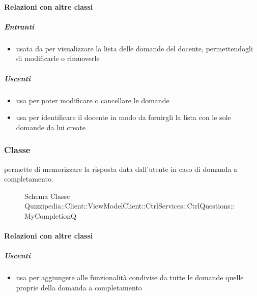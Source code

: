\paragraph{Relazioni con altre classi}
\subparagraph{Entranti}
\begin{itemize}
\item usata da  per visualizzare la lista delle domande del docente, permettendogli di modificarle o rimuoverle
\end{itemize}
\subparagraph{Uscenti}
\begin{itemize}
\item usa  per poter modificare o cancellare le domande
\item usa  per identificare il docente in modo da fornirgli la lista con le sole domande da lui create
\end{itemize}
\subsubsection{Classe }
permette di memorizzare la risposta data dall'utente in caso di domanda a completamento.
\begin{figure}[H]
\centering
\noindent{}
\caption[Schema Classe MyCompletionQ]{Schema Classe Quizzipedia::Client::ViewModelClient::CtrlServices::CtrlQuestions::MyCompletionQ}
\end{figure}
\paragraph{Relazioni con altre classi}
\subparagraph{Uscenti}
\begin{itemize}
\item usa  per aggiungere alle funzionalità condivise da tutte le domande quelle proprie della domanda a completamento
\end{itemize}
